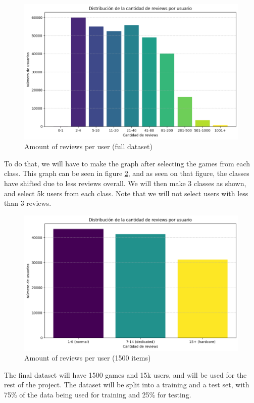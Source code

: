 \documentclass{article}
\begin{document}
\begin{figure}[h]
    \centering
    \includegraphics[width=0.8\linewidth]{reviewsPorUsuario.png}
    \caption{Amount of reviews per user (full dataset)}
    \label{fig:reviewsPorUsuario}
\end{figure}

To do that, we will have to make the graph after selecting the games from each class. This graph can be seen in figure \ref{fig:reviewsPorUsuario2}, and as seen on that figure, the classes have shifted due to less reviews overall. We will then make 3 classes as shown, and select 5k users from each class. Note that we will not select users with less than 3 reviews.

\begin{figure}[h]
    \centering
    \includegraphics[width=0.8\linewidth]{reviewsPorUsuario2.png}
    \caption{Amount of reviews per user (1500 items)}
    \label{fig:reviewsPorUsuario2}
\end{figure}

The final dataset will have 1500 games and 15k users, and will be used for the rest of the project. The dataset will be split into a training and a test set, with 75\% of the data being used for training and 25\% for testing.
\end{document}
